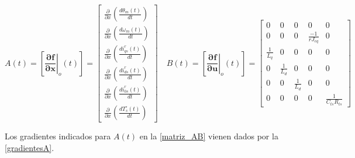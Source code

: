 \documentclass[a4paper, 10pt, onecolumn,journal]{ieeeconf}
\begin{document}
\begin{equation}
    A(t) = \left[ \left. \frac{\mathbf{\partial f}}{\mathbf{\partial x}} \right|_{o}(t) \right] =
    \begin{bmatrix}
        \frac{\partial}{\partial x}\left( \frac{d \theta_m(t)}{dt}\right) \\ 
        \frac{\partial}{\partial x}\left( \frac{d \omega_m(t)}{dt}\right) \\
        \frac{\partial}{\partial x}\left( \frac{d i^r_{qs}(t)}{dt}\right) \\ 
        \frac{\partial}{\partial x}\left( \frac{d i^r_{ds}(t)}{dt}\right) \\ 
        \frac{\partial}{\partial x}\left( \frac{d i^r_{0s}(t)}{dt}\right) \\ 
        \frac{\partial}{\partial x}\left( \frac{d T^\circ_s(t)}{dt}\right) 
    \end{bmatrix}\quad
    B(t) = \left[ \left. \frac{\mathbf{\partial f}}{\mathbf{\partial u}} \right|_{o}(t) \right] =
    \begin{bmatrix}
        0 & 0 & 0 & 0 & 0\\
        0 & 0 & 0 & \frac{-1}{r J_{eq}} & 0\\
        \frac{1}{L_q} & 0 & 0 & 0 & 0\\
        0 & \frac{1}{L_d} & 0 & 0 & 0\\
        0 & 0 & \frac{1}{L_d} & 0 & 0\\
        0 & 0 & 0 & 0 & \frac{1}{C_{ts} R_{ts}}
    \end{bmatrix}
    \label{matriz_AB}
\end{equation}

Los gradientes indicados para $A(t)$ en la \cref{matriz_AB} vienen dados por la \cref{gradientesA}.
\end{document}

